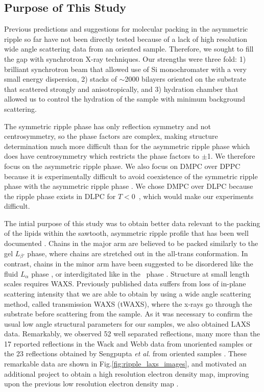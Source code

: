 \subsection{Purpose of This Study}
Previous predictions and suggestions for molecular packing in the asymmetric
ripple so far have not been directly tested because of a lack of 
high resolution wide angle scattering data from an oriented sample.
Therefore, we sought to fill the gap
with synchrotron X-ray techniques. Our strengths were three fold: 1) brilliant
synchrotron beam that allowed use of Si monochromater with a very small
energy dispersion, 2) stacks of $\sim$2000 bilayers oriented on the substrate
that scattered strongly and anisotropically, and 3) hydration chamber that 
allowed us to control the hydration of the sample with minimum background scattering.

The symmetric ripple phase has only reflection symmetry and not centrosymmetry, 
so the phase factors are complex, making structure determination much more difficult 
than for the asymmetric ripple phase which does have centrosymmetry which restricts 
the phase factors to $\pm$1. We therefore focus on the asymmetric ripple phase.  
We also focus on DMPC over DPPC because it is experimentally difficult to avoid 
coexistence of the symmetric ripple phase with the asymmetric ripple phase
\cite{ref:Katsaras00}.
We chose DMPC over DLPC because the ripple phase exists in DLPC
for $T<0$~\textcelsius, which would make our experiments difficult.

The intial purpose of this study was to obtain better data relevant
to the packing of the lipids within the sawtooth, asymmetric ripple profile 
that has been well documented \cite{ref:Sun96,ref:Sengupta03}.
Chains in the major arm are believed to be packed similarly to the gel $L_{\beta'}$ phase,
where chains are stretched out in the all-trans conformation. 
In contrast, chains in the minor arm have been suggested to be disordered
like the fluid $L_\alpha$ phase \cite{ref:Wittebort81,ref:Schneider83,ref:Cunningham98,ref:Riske09}, 
or interdigitated like in the \LI\ phase \cite{ref:deVries05,ref:Lenz07}. 
Structure at small length scales requires WAXS.  
Previously published data suffers from loss 
of in-plane scattering intensity that we are able to obtain by using a wide 
angle scattering method, called  transmission WAXS (tWAXS), where the x-rays 
go through the substrate before scattering from the sample.  As it was 
necessary to confirm the usual low angle structural parameters for our 
samples, we also obtained LAXS data. Remarkably, we observed 52 well 
separated reflections, many more than the 17 reported reflections 
in the Wack and Webb data from unoriented samples
\cite{ref:Wack89} or the 23 reflections obtained by Sengpupta \textit{et al.}
from oriented samples \cite{ref:Sengupta99}.  
These remarkable data are shown in Fig.\ref{fig:ripple_laxs_images}, and 
motivated an additional project to obtain a high resolution electron density map, 
improving upon the previous low resolution electron density map \cite{ref:Sun96}.

